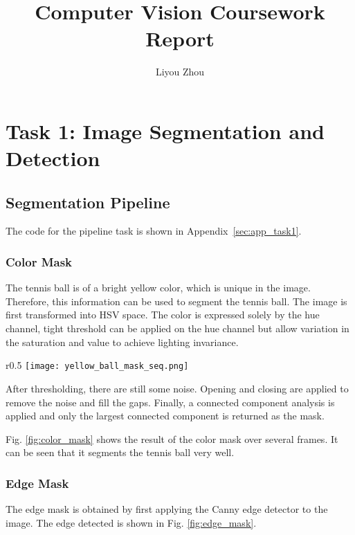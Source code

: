 \documentclass{report}
\title{Computer Vision Coursework Report}
\author{Liyou Zhou}
\begin{document}
\maketitle


\chapter{Task 1: Image Segmentation and Detection}

\section{Segmentation Pipeline}

The code for the pipeline task is shown in Appendix~\ref{sec:app_task1}.

\subsection{Color Mask}

The tennis ball is of a bright yellow color, which is unique in the image. Therefore, this information can be used to segment the tennis ball. The image is first transformed into HSV space. The color is expressed solely by the hue channel, tight threshold can be applied on the hue channel but allow variation in the saturation and value to achieve lighting invariance.

\begin{wrapfigure}{r}{0.5\textwidth}
    \centering
    \texttt{[image: yellow\_ball\_mask\_seq.png]}
    \caption{Color mask applied to several frames.}
    \label{fig:color_mask}
\end{wrapfigure}

After thresholding, there are still some noise. Opening and closing are applied to remove the noise and fill the gaps. Finally, a connected component analysis is applied and only the largest connected component is returned as the mask.

Fig. \ref{fig:color_mask} shows the result of the color mask over several frames. It can be seen that it segments the tennis ball very well.



\subsection{Edge Mask}

The edge mask is obtained by first applying the Canny edge detector\cite{cannyComputationalApproachEdge1986} to the image. The edge detected is shown in Fig. \ref{fig:edge_mask}.
\end{document}
